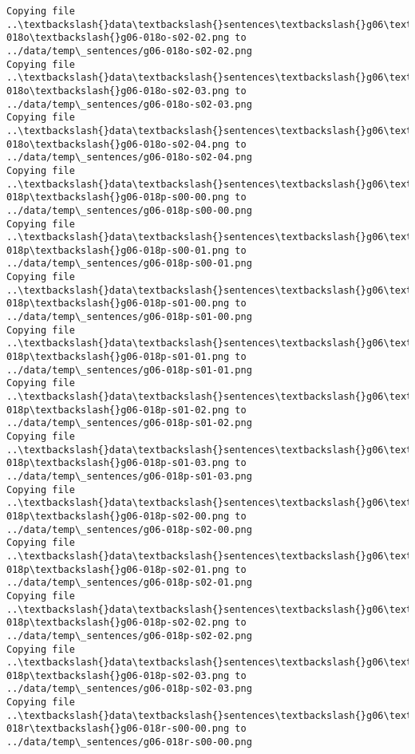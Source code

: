 \documentclass[11pt]{article}
\begin{document}
\begin{Verbatim}[commandchars=\\\{\}]
Copying file ..\textbackslash{}data\textbackslash{}sentences\textbackslash{}g06\textbackslash{}g06-018o\textbackslash{}g06-018o-s02-02.png to
../data/temp\_sentences/g06-018o-s02-02.png
Copying file ..\textbackslash{}data\textbackslash{}sentences\textbackslash{}g06\textbackslash{}g06-018o\textbackslash{}g06-018o-s02-03.png to
../data/temp\_sentences/g06-018o-s02-03.png
Copying file ..\textbackslash{}data\textbackslash{}sentences\textbackslash{}g06\textbackslash{}g06-018o\textbackslash{}g06-018o-s02-04.png to
../data/temp\_sentences/g06-018o-s02-04.png
Copying file ..\textbackslash{}data\textbackslash{}sentences\textbackslash{}g06\textbackslash{}g06-018p\textbackslash{}g06-018p-s00-00.png to
../data/temp\_sentences/g06-018p-s00-00.png
Copying file ..\textbackslash{}data\textbackslash{}sentences\textbackslash{}g06\textbackslash{}g06-018p\textbackslash{}g06-018p-s00-01.png to
../data/temp\_sentences/g06-018p-s00-01.png
Copying file ..\textbackslash{}data\textbackslash{}sentences\textbackslash{}g06\textbackslash{}g06-018p\textbackslash{}g06-018p-s01-00.png to
../data/temp\_sentences/g06-018p-s01-00.png
Copying file ..\textbackslash{}data\textbackslash{}sentences\textbackslash{}g06\textbackslash{}g06-018p\textbackslash{}g06-018p-s01-01.png to
../data/temp\_sentences/g06-018p-s01-01.png
Copying file ..\textbackslash{}data\textbackslash{}sentences\textbackslash{}g06\textbackslash{}g06-018p\textbackslash{}g06-018p-s01-02.png to
../data/temp\_sentences/g06-018p-s01-02.png
Copying file ..\textbackslash{}data\textbackslash{}sentences\textbackslash{}g06\textbackslash{}g06-018p\textbackslash{}g06-018p-s01-03.png to
../data/temp\_sentences/g06-018p-s01-03.png
Copying file ..\textbackslash{}data\textbackslash{}sentences\textbackslash{}g06\textbackslash{}g06-018p\textbackslash{}g06-018p-s02-00.png to
../data/temp\_sentences/g06-018p-s02-00.png
Copying file ..\textbackslash{}data\textbackslash{}sentences\textbackslash{}g06\textbackslash{}g06-018p\textbackslash{}g06-018p-s02-01.png to
../data/temp\_sentences/g06-018p-s02-01.png
Copying file ..\textbackslash{}data\textbackslash{}sentences\textbackslash{}g06\textbackslash{}g06-018p\textbackslash{}g06-018p-s02-02.png to
../data/temp\_sentences/g06-018p-s02-02.png
Copying file ..\textbackslash{}data\textbackslash{}sentences\textbackslash{}g06\textbackslash{}g06-018p\textbackslash{}g06-018p-s02-03.png to
../data/temp\_sentences/g06-018p-s02-03.png
Copying file ..\textbackslash{}data\textbackslash{}sentences\textbackslash{}g06\textbackslash{}g06-018r\textbackslash{}g06-018r-s00-00.png to
../data/temp\_sentences/g06-018r-s00-00.png

\end{Verbatim}
\end{document}
